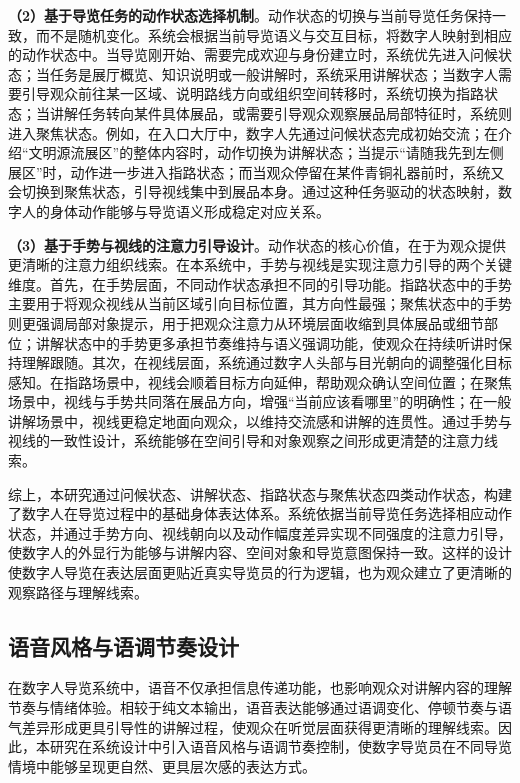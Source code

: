 \textbf{（2）基于导览任务的动作状态选择机制}。动作状态的切换与当前导览任务保持一致，而不是随机变化。系统会根据当前导览语义与交互目标，将数字人映射到相应的动作状态中。当导览刚开始、需要完成欢迎与身份建立时，系统优先进入问候状态；当任务是展厅概览、知识说明或一般讲解时，系统采用讲解状态；当数字人需要引导观众前往某一区域、说明路线方向或组织空间转移时，系统切换为指路状态；当讲解任务转向某件具体展品，或需要引导观众观察展品局部特征时，系统则进入聚焦状态。例如，在入口大厅中，数字人先通过问候状态完成初始交流；在介绍“文明源流展区”的整体内容时，动作切换为讲解状态；当提示“请随我先到左侧展区”时，动作进一步进入指路状态；而当观众停留在某件青铜礼器前时，系统又会切换到聚焦状态，引导视线集中到展品本身。通过这种任务驱动的状态映射，数字人的身体动作能够与导览语义形成稳定对应关系。

\textbf{（3）基于手势与视线的注意力引导设计}。动作状态的核心价值，在于为观众提供更清晰的注意力组织线索。在本系统中，手势与视线是实现注意力引导的两个关键维度。首先，在手势层面，不同动作状态承担不同的引导功能。指路状态中的手势主要用于将观众视线从当前区域引向目标位置，其方向性最强；聚焦状态中的手势则更强调局部对象提示，用于把观众注意力从环境层面收缩到具体展品或细节部位；讲解状态中的手势更多承担节奏维持与语义强调功能，使观众在持续听讲时保持理解跟随。其次，在视线层面，系统通过数字人头部与目光朝向的调整强化目标感知。在指路场景中，视线会顺着目标方向延伸，帮助观众确认空间位置；在聚焦场景中，视线与手势共同落在展品方向，增强“当前应该看哪里”的明确性；在一般讲解场景中，视线更稳定地面向观众，以维持交流感和讲解的连贯性。通过手势与视线的一致性设计，系统能够在空间引导和对象观察之间形成更清楚的注意力线索。

综上，本研究通过问候状态、讲解状态、指路状态与聚焦状态四类动作状态，构建了数字人在导览过程中的基础身体表达体系。系统依据当前导览任务选择相应动作状态，并通过手势方向、视线朝向以及动作幅度差异实现不同强度的注意力引导，使数字人的外显行为能够与讲解内容、空间对象和导览意图保持一致。这样的设计使数字人导览在表达层面更贴近真实导览员的行为逻辑，也为观众建立了更清晰的观察路径与理解线索。

\subsection{语音风格与语调节奏设计}
在数字人导览系统中，语音不仅承担信息传递功能，也影响观众对讲解内容的理解节奏与情绪体验。相较于纯文本输出，语音表达能够通过语调变化、停顿节奏与语气差异形成更具引导性的讲解过程，使观众在听觉层面获得更清晰的理解线索。因此，本研究在系统设计中引入语音风格与语调节奏控制，使数字导览员在不同导览情境中能够呈现更自然、更具层次感的表达方式。

